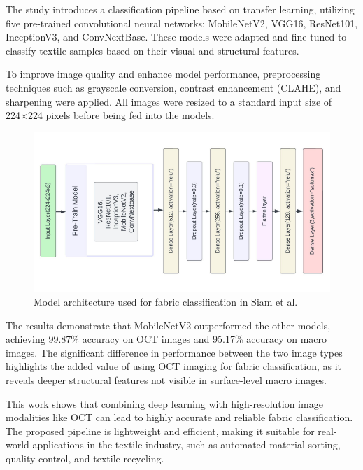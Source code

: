 The study introduces a classification pipeline based on transfer learning, utilizing five pre-trained convolutional neural networks: MobileNetV2, VGG16, ResNet101, InceptionV3, and ConvNextBase. These models were adapted and fine-tuned to classify textile samples based on their visual and structural features.

To improve image quality and enhance model performance, preprocessing techniques such as grayscale conversion, contrast enhancement (CLAHE), and sharpening were applied. All images were resized to a standard input size of 224×224 pixels before being fed into the models.

\begin{figure}[H]
    \centering
    \begin{minipage}{1\linewidth}
        \includegraphics[width=\linewidth]{images/Paper2Model.png}
    \end{minipage}
    \caption[Model architecture - Siam et al.~\cite{siam2023textilenet}]{Model architecture used for fabric classification in Siam et al.~\cite{siam2023textilenet}}
\end{figure}

The results demonstrate that MobileNetV2 outperformed the other models, achieving 99.87\% accuracy on OCT images and 95.17\% accuracy on macro images. The significant difference in performance between the two image types highlights the added value of using OCT imaging for fabric classification, as it reveals deeper structural features not visible in surface-level macro images.

This work shows that combining deep learning with high-resolution image modalities like OCT can lead to highly accurate and reliable fabric classification. The proposed pipeline is lightweight and efficient, making it suitable for real-world applications in the textile industry, such as automated material sorting, quality control, and textile recycling.

